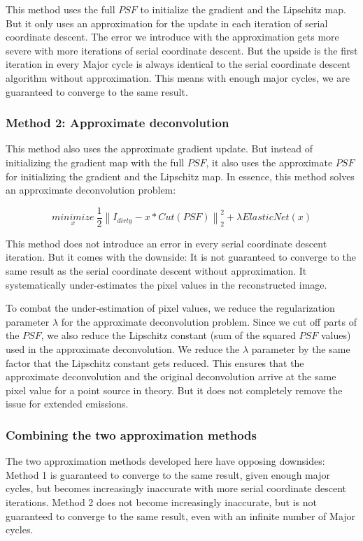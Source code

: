 This method uses the full $PSF$ to initialize the gradient and the Lipschitz map. But it only uses an approximation for the update in each iteration of serial coordinate descent. The error we introduce with the approximation gets more severe with more iterations of serial coordinate descent. But the upside is the first iteration in every Major cycle is always identical to the serial coordinate descent algorithm without approximation. This means with enough major cycles, we are guaranteed to converge to the same result.


\subsubsection{Method 2: Approximate deconvolution} \label{gradients:methods:deconv}
This method also uses the approximate gradient update. But instead of initializing the gradient map with the full $PSF$, it also uses the approximate $PSF$ for initializing the gradient and the Lipschitz map. In essence, this method solves an approximate deconvolution problem:

\begin{equation}\label{gradients:method2:objective}
\underset{x}{minimize} \: \frac{1}{2} \left \| I_{dirty} - x * Cut(PSF) \right \|_2^2 + \lambda ElasticNet(x)
\end{equation}

This method does not introduce an error in every serial coordinate descent iteration. But it comes with the downside: It is not guaranteed to converge to the same result as the serial coordinate descent without approximation. It systematically under-estimates the pixel values in the reconstructed image.

To combat the under-estimation of pixel values, we reduce the regularization parameter $\lambda$ for the approximate deconvolution problem. Since we cut off parts of the $PSF$, we also reduce the Lipschitz constant (sum of the squared $PSF$ values) used in the approximate deconvolution. We reduce the $\lambda$ parameter by the same factor that the Lipschitz constant gets reduced. This ensures that the approximate deconvolution and the original deconvolution arrive at the same pixel value for a point source in theory. But it does not completely remove the issue for extended emissions.


\subsubsection{Combining the two approximation methods}
The two approximation methods developed here have opposing downsides: Method 1 is guaranteed to converge to the same result, given enough major cycles, but becomes increasingly inaccurate with more serial coordinate descent iterations. Method 2 does not become increasingly inaccurate, but is not guaranteed to converge to the same result, even with an infinite number of Major cycles.

